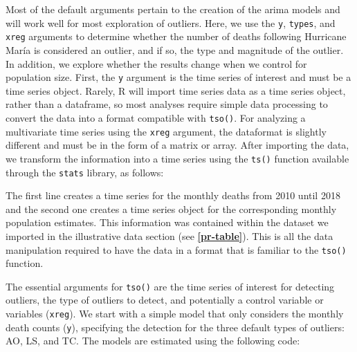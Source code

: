 \documentclass[12pt]{article}
\newenvironment{Shaded}{\begin{snugshade}}{\end{snugshade}}
\newcommand{\AttributeTok}[1]{\textcolor[rgb]{0.77,0.63,0.00}{#1}}
\newcommand{\DecValTok}[1]{\textcolor[rgb]{0.00,0.00,0.81}{#1}}
\newcommand{\FunctionTok}[1]{\textcolor[rgb]{0.00,0.00,0.00}{#1}}
\newcommand{\NormalTok}[1]{#1}
\newcommand{\OtherTok}[1]{\textcolor[rgb]{0.56,0.35,0.01}{#1}}
\newcommand{\SpecialCharTok}[1]{\textcolor[rgb]{0.00,0.00,0.00}{#1}}
\begin{document}
Most of the default arguments pertain to the creation of the arima
models and will work well for most exploration of outliers. Here, we use
the \texttt{y}, \texttt{types}, and \texttt{xreg} arguments to determine
whether the number of deaths following Hurricane María is considered an
outlier, and if so, the type and magnitude of the outlier. In addition,
we explore whether the results change when we control for population
size. First, the \texttt{y} argument is the time series of interest and
must be a time series object. Rarely, R will import time series data as
a time series object, rather than a dataframe, so most analyses require
simple data processing to convert the data into a format compatible with
\texttt{tso()}. For analyzing a multivariate time series using the
\texttt{xreg} argument, the dataformat is slightly different and must be
in the form of a matrix or array. After importing the data, we transform
the information into a time series using the \texttt{ts()} function
available through the \texttt{stats} library, as follows:

\begin{Shaded}
\end{Shaded}

The first line creates a time series for the monthly deaths from 2010
until 2018 and the second one creates a time series object for the
corresponding monthly population estimates. This information was
contained within the dataset we imported in the illustrative data
section (see \textbf{\autoref{pr-table}}). This is all the data
manipulation required to have the data in a format that is familiar to
the \texttt{tso()} function.

The essential arguments for \texttt{tso()} are the time series of
interest for detecting outliers, the type of outliers to detect, and
potentially a control variable or variables (\texttt{xreg}). We start
with a simple model that only considers the monthly death counts
(\texttt{y}), specifying the detection for the three default types of
outliers: AO, LS, and TC. The models are estimated using the following
code:
\end{document}
